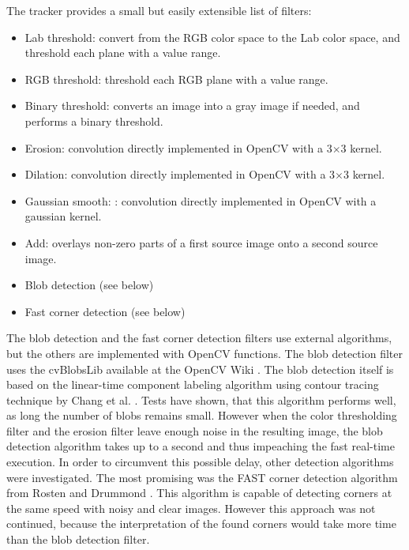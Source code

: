 The tracker provides a small but easily extensible list of filters:
\begin{itemize}
\item Lab threshold: convert from the RGB color space to the Lab color space, and threshold each plane with a value range.
\item RGB threshold: threshold each RGB plane with a value range.
\item Binary threshold: converts an image into a gray image if needed, and performs a binary threshold.
\item Erosion: convolution directly implemented in OpenCV with a 3$\times$3 kernel.
\item Dilation: convolution directly implemented in OpenCV with a 3$\times$3 kernel.
\item Gaussian smooth: : convolution directly implemented in OpenCV with a gaussian kernel.
\item Add: overlays non-zero parts of a first source image onto a second source image.
\item Blob detection (see below)
\item Fast corner detection (see below)
\end{itemize}

The blob detection and the fast corner detection filters use external algorithms, but the others are implemented with OpenCV functions. The blob detection filter uses the cvBlobsLib available at the OpenCV Wiki \cite{cvblobslib}. The blob detection itself is based on the linear-time component labeling algorithm using contour tracing technique by Chang et al. \cite{blobs}. Tests have shown, that this algorithm performs well, as long the number of blobs remains small. However when the color thresholding filter and the erosion filter leave enough noise in the resulting image, the blob detection algorithm takes up to a second and thus impeaching the fast real-time execution. 
In order to circumvent this possible delay, other detection algorithms were investigated. The most promising was the FAST corner detection algorithm from Rosten and Drummond \cite{fast, fast2}. This algorithm is capable of detecting corners at the same speed with noisy and clear images. However this approach was not continued, because the interpretation of the found corners would take more time than the blob detection filter.


